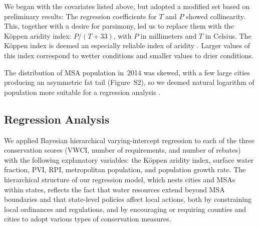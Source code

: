 \documentclass[draft,linenumbers]{agujournal}\usepackage{knitr}
\begin{document}
We began with the covariates listed above, but adopted a modified set based on preliminary results: The regression coefficients for $T$ and $P$ showed collinearity.
This, together with a desire for parsimony, led us to replace them with the K\"oppen aridity index: $P / (T + 33)$, with $P$ in millimeters and $T$ in Celsius.
The K\"oppen index is deemed an especially reliable index of aridity \citep{quan_aridity_2013}. Larger values of this index correspond to wetter conditions and smaller values to drier conditions.

The distribution of MSA population in~2014 was skewed, with a few large cities producing an asymmetric fat tail (Figure~S2), so we deemed natural logarithm of population more suitable for a regression analysis \citep[pp.~59--61]{gelman_arm_2007}.

\subsection{Regression Analysis}
We applied Bayesian hierarchical varying-intercept regression to each of the three conservation scores (VWCI, number of requirements, and number of rebates) with the following explanatory variables: the K\"oppen aridity index, surface water fraction, PVI, RPI, metropolitan population, and population growth rate. The hierarchical structure of our regression model, which nests cities and MSAs within states, reflects the fact that water resources extend beyond MSA boundaries and that state-level policies affect local actions, both by constraining local ordinances and regulations, and by encouraging or requiring counties and cities to adopt various types of conservation measures.
\end{document}
